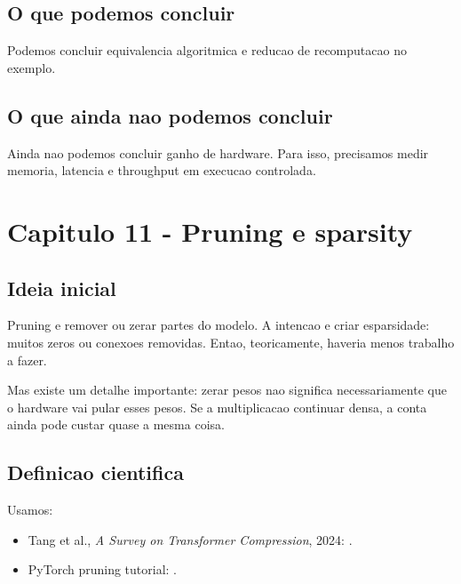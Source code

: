 \subsection{O que podemos concluir}



Podemos concluir equivalencia algoritmica e reducao de recomputacao no exemplo.



\subsection{O que ainda nao podemos concluir}




Ainda nao podemos concluir ganho de hardware. Para isso, precisamos medir memoria, latencia e throughput em execucao controlada.



\section{Capitulo 11 - Pruning e sparsity}



\subsection{Ideia inicial}





Pruning e remover ou zerar partes do modelo. A intencao e criar esparsidade: muitos zeros ou conexoes removidas. Entao, teoricamente, haveria menos trabalho a fazer.





Mas existe um detalhe importante: zerar pesos nao significa necessariamente que o hardware vai pular esses pesos. Se a multiplicacao continuar densa, a conta ainda pode custar quase a mesma coisa.



\subsection{Definicao cientifica}



Usamos:


\begin{itemize}
\item Tang et al., \emph{A Survey on Transformer Compression}, 2024:
.
\item PyTorch pruning tutorial:
.
\end{itemize}


